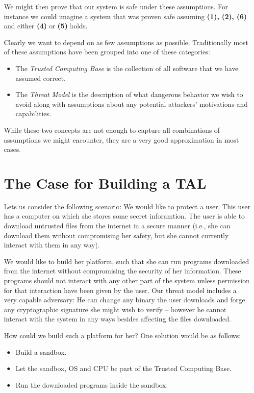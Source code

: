 We might then prove that our system is safe under these assumptions. For
instance we could imagine a system that was proven safe assuming \textbf{(1),
  (2), (6)} and either \textbf{(4)} or \textbf{(5)} holds.

Clearly we want to depend on as few assumptions as possible. Traditionally most
of these assumptions have been grouped into one of these categories:

\begin{itemize}
\item The \emph{Trusted Computing Base} is the collection of all software that
  we have assumed correct.
\item The \emph{Threat Model} is the description of what dangerous behavior we
  wish to avoid along with assumptions about any potential attackers'
  motivations and capabilities.
\end{itemize}

While these two concepts are not enough to capture all combinations of
assumptions we might encounter, they are a very good approximation in most
cases.

\section{The Case for Building a TAL}
Lets us consider the following scenario: We would like to protect a user. This
user has a computer on which she stores some secret inforamtion. The user is
able to download untrusted files from the internet in a secure manner (i.e., she
can download them without compromising her safety, but she cannot currently
interact with them in any way).

We would like to build her platform, such that she can run programs downloaded
from the internet without compromising the security of her information. These
programs should not interact with any other part of the system unless permission
for that interaction have been given by the user. Our threat model includes a
very capable adversary: He can change any binary the user downloads and forge
any cryptographic signature she might wish to verify -- however he cannot
interact with the system in any ways besides affecting the files downloaded.

How could we build such a platform for her? One solution would be as follows:

\begin{itemize}
\item Build a sandbox.
\item Let the sandbox, OS and CPU be part of the Trusted Computing Base.
\item Run the downloaded programs inside the sandbox.
\end{itemize}

